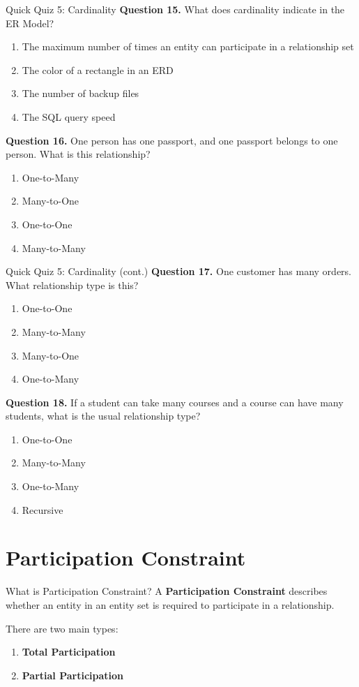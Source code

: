 \documentclass[aspectratio=169,11pt]{beamer}
\newcommand{\keyword}[1]{\textcolor{accent}{\textbf{#1}}}
\newcommand{\kw}[1]{\keyword{#1}}
\newcommand{\tightlist}{\setlength{\itemsep}{2pt}\setlength{\parskip}{0pt}}
\newcommand{\smallitem}{\setlength{\itemsep}{2pt}\setlength{\parskip}{0pt}}
\newcommand{\qoption}[2]{\item[#1.] #2}
\begin{document}
\begin{frame}{Quick Quiz 5: Cardinality}
\small
\textbf{Question 15.} What does cardinality indicate in the ER Model?
\begin{enumerate}
\tightlist
  \qoption{A}{The maximum number of times an entity can participate in a relationship set}
  \qoption{B}{The color of a rectangle in an ERD}
  \qoption{C}{The number of backup files}
  \qoption{D}{The SQL query speed}
\end{enumerate}

\textbf{Question 16.} One person has one passport, and one passport belongs to one person. What is this relationship?
\begin{enumerate}
\tightlist
  \qoption{A}{One-to-Many}
  \qoption{B}{Many-to-One}
  \qoption{C}{One-to-One}
  \qoption{D}{Many-to-Many}
\end{enumerate}
\end{frame}

\begin{frame}{Quick Quiz 5: Cardinality (cont.)}
\small
\textbf{Question 17.} One customer has many orders. What relationship type is this?
\begin{enumerate}
\tightlist
  \qoption{A}{One-to-One}
  \qoption{B}{Many-to-Many}
  \qoption{C}{Many-to-One}
  \qoption{D}{One-to-Many}
\end{enumerate}

\textbf{Question 18.} If a student can take many courses and a course can have many students, what is the usual relationship type?
\begin{enumerate}
\tightlist
  \qoption{A}{One-to-One}
  \qoption{B}{Many-to-Many}
  \qoption{C}{One-to-Many}
  \qoption{D}{Recursive}
\end{enumerate}
\end{frame}

\section{Participation Constraint}

\begin{frame}{What is Participation Constraint?}
\small
A \kw{Participation Constraint} describes whether an entity in an entity set is required to participate in a relationship.

\vspace{2mm}
There are two main types:
\begin{enumerate}
\smallitem
  \item \kw{Total Participation}
  \item \kw{Partial Participation}
\end{enumerate}
\end{frame}
\end{document}
